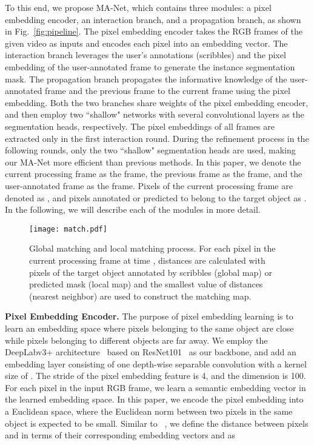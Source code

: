 \documentclass[10pt,twocolumn,letterpaper]{article}
\begin{document}
To this end, we propose MA-Net, which contains three modules: a pixel embedding encoder, an interaction branch, and a propagation branch, as shown in Fig.~\ref{fig:pipeline}.  The pixel embedding encoder takes the RGB frames of the given video as inputs and encodes each pixel into an embedding vector. The interaction branch leverages the user's annotations (scribbles) and the pixel embedding of the user-annotated frame to generate the instance segmentation mask. The propagation branch propagates the informative knowledge of the user-annotated frame and the previous frame to the current frame using the pixel embedding. Both the two branches share weights of the pixel embedding encoder, and then employ two ``shallow" networks with several convolutional layers as the segmentation heads, respectively. The pixel embeddings of all frames are extracted only in the first interaction round. During the refinement process in the following rounds, only the two ``shallow" segmentation heads are used, making our MA-Net more efficient than previous methods. 
In this paper, we denote the current processing frame as the  frame, the previous frame as the  frame, and the user-annotated frame as the  frame. Pixels of the current processing frame are denoted as , and pixels annotated or predicted to belong to the target object  as .
In the following, we will describe each of the modules in more detail.
\begin{figure}[t]
\texttt{[image: match.pdf]}
\centering
\caption{Global matching and local matching process. For each pixel in the current processing frame at time , distances are calculated with pixels of the target object annotated by scribbles (global map) or predicted mask (local map) and the smallest value of distances (nearest neighbor) are used to construct the matching map.}
\vspace{-3mm}
\label{fig:match}
\end{figure}



\textbf{Pixel Embedding Encoder.}
The purpose of pixel embedding learning is to learn an embedding space where pixels belonging to the same object are close while pixels belonging to different objects are far away. 
 We employ the DeepLabv3+ architecture~\cite{chen2018encoder} based on ResNet101~\cite{he2016deep} as our backbone, and add an embedding layer consisting of one depth-wise separable convolution with a kernel size of . The stride of the pixel embedding feature is 4, and the dimension is 100.
For each pixel  in the input RGB frame, we learn a semantic embedding vector  in the learned embedding space.  In this paper, we encode the pixel embedding into a Euclidean space, where the Euclidean norm between two pixels in the same object is expected to be small. Similar to ~\cite{fathi2017semantic,voigtlaender2019feelvos}, we define the distance between pixels  and  in terms of their corresponding embedding vectors  and  as
\vspace{-3mm}
\end{document}
